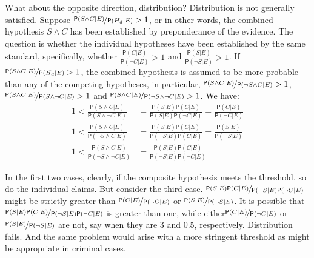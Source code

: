 \documentclass[
  10pt,
  dvipsnames,enabledeprecatedfontcommands]{scrartcl}
\newcommand{\n}{\neg}
\newcommand{\et}{\wedge}
\newcommand{\pr}[1]{\ensuremath{\mathsf{P}(#1)}}
\begin{document}
What about the opposite direction, distribution? Distribution is not
generally satisfied. Suppose
\(\nicefrac{\pr{S\et C\vert E}}{\pr{H_d \vert E}}>1\), or in other
words, the combined hypothesis \(S \et C\) has been established by
preponderance of the evidence. The question is whether the individual
hypotheses have been established by the same standard, specifically,
whether \(\frac{\pr{C\vert E}}{\pr{\n C \vert E}} > 1\) and
\(\frac{\pr{S\vert E}}{\pr{\n S \vert E}} > 1\). If
\(\nicefrac{\pr{S\et C\vert E}}{\pr{H_d \vert E}}>1\), the combined
hypothesis is assumed to be more probable than any of the competing
hypotheses, in particular,
\(\nicefrac{\pr{S\et C\vert E}}{\pr{\neg S \et C \vert E}}>1\),
\(\nicefrac{\pr{S\et C\vert E}}{\pr{S \et \neg C \vert E}}>1\) and
\(\nicefrac{\pr{S\et C\vert E}}{\pr{\neg S \et \neg C \vert E}}>1\). We
have: \begin{align}\label{eq:cheng-multiplication-two}
1 < \frac{\pr{S\et C\vert E}}{\pr{S\et \n C\vert E}} & = \frac{\pr{S\vert E}\pr{C\vert E}}{\pr{S \vert E}\pr{\n C \vert E}}  =\frac{\pr{C\vert E}}{\pr{\n C \vert E}} \\
\nonumber
1 < \frac{\pr{S\et C\vert E}}{\pr{\n S\et C\vert E}} & = \frac{\pr{S\vert E}\pr{C\vert E}}{\pr{\n S \vert E}\pr{C\vert E}}  = \frac{\pr{S\vert E}}{\pr{\n S \vert E}}  \\
\nonumber
1 < \frac{\pr{S\et C\vert E}}{\pr{\n S\et \n C\vert E}} & = \frac{\pr{S\vert E}\pr{C\vert E}}{\pr{\n S \vert E}\pr{\n C \vert E}}   
\end{align}

\noindent In the first two cases, clearly, if the composite hypothesis
meets the threshold, so do the individual claims. But consider the third
case.
\(\nicefrac{\pr{S\vert E}\pr{C\vert E}}{\pr{\n S \vert E}\pr{\n C \vert E}}\)
might be strictly greater than
\(\nicefrac{\pr{C\vert E}}{\pr{\n C \vert E}}\) or
\(\nicefrac{\pr{S\vert E}}{\pr{\n S \vert E}}\). It is possible that
\(\nicefrac{\pr{S\vert E}\pr{C\vert E}}{\pr{\n S \vert E}\pr{\n C \vert E}}\)
is greater than one, while
either\(\nicefrac{\pr{C\vert E}}{\pr{\n C \vert E}}\) or
\(\nicefrac{\pr{S\vert E}}{\pr{\n S \vert E}}\) are not, say when they
are 3 and 0.5, respectively. Distribution fails. And the same problem
would arise with a more stringent threshold as might be appropriate in
criminal cases.
\end{document}
